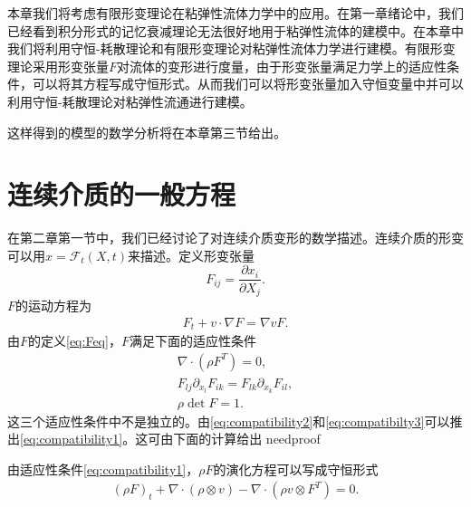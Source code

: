 \documentclass{article}
\begin{document}
本章我们将考虑有限形变理论在粘弹性流体力学中的应用。在第一章绪论中，我们已经看到积分形式的记忆衰减理论无法很好地用于粘弹性流体的建模中。在本章中我们将利用守恒-耗散理论和有限形变理论对粘弹性流体力学进行建模。有限形变理论采用形变张量$F$对流体的变形进行度量，由于形变张量满足力学上的适应性条件，可以将其方程写成守恒形式。从而我们可以将形变张量加入守恒变量中并可以利用守恒-耗散理论对粘弹性流通进行建模。

这样得到的模型的数学分析将在本章第三节给出。

\section{连续介质的一般方程}
在第二章第一节中，我们已经讨论了对连续介质变形的数学描述。连续介质的形变可以用$x=\mathcal{F}_t (X,t)$来描述。定义形变张量
\begin{equation*}\label{eq:Fdef}
	F_{ij} = \frac{\partial x_i}{\partial X_j}.
\end{equation*}
$F$的运动方程为
\begin{eqnarray}\label{eq:Feq}
F_t + v \cdot \nabla F = \nabla v F.
\end{eqnarray}
由$F$的定义\eqref{eq:Feq}，$F$满足下面的适应性条件
\begin{eqnarray}
\nabla \cdot (\rho F^T) = 0,\label{eq:compatibility1} \\
 F_{lj} \partial_{x_l} F_{ik} = F_{lk} \partial_{x_k} F_{il} , \label{eq:compatibility2} \\
 \rho \det F = 1. \label{eq:compatibilty3} \label{eq:compatibility3}
\end{eqnarray}
这三个适应性条件中不是独立的。由\eqref{eq:compatibility2}和\eqref{eq:compatibilty3}可以推出\eqref{eq:compatibility1}。这可由下面的计算给出
needproof

由适应性条件\eqref{eq:compatibility1}，$\rho F$的演化方程可以写成守恒形式
\begin{eqnarray*}
(\rho F)_t + \nabla \cdot (\rho \otimes v) - \nabla \cdot (\rho v \otimes F^T) = 0 .
\end{eqnarray*} 
\end{document}
